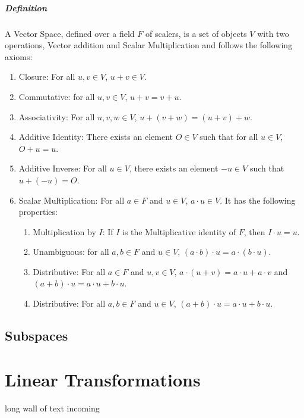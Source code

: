 \documentclass[12pt, oneside]{book}
\begin{document}
\paragraph{Definition} A Vector Space, defined over a field \( F \) of scalers, is a set of objects \(V\) with two operations, Vector addition and Scalar Multiplication and follows the following axioms:
\begin{enumerate}
    \item Closure: For all \( u,v \in V \), \(u + v \in V \).
    \item Commutative: for all \( u,v \in V \), \(u + v = v + u \).
    \item Associativity: For all \( u,v,w \in V \), \(u + (v + w) = (u + v) + w \).
    \item Additive Identity: There exists an element \( O \in V \) such that for all \( u \in V \), \(O + u = u \).
    \item Additive Inverse: For all \( u \in V \), there exists an element \( -u \in V \) such that \(u + (-u) = O \).
    \item Scalar Multiplication: For all \( a \in F \) and \( u \in V \), \(a \cdot u \in V \). It has the following properties:
    \begin{enumerate}
        \item Multiplication by \(I\): If \(I\) is the Multiplicative identity of \( F \), then \(I \cdot u = u \).
        \item Unambiguous: for all \( a,b \in F \) and \( u \in V \), \( (a \cdot b) \cdot u = a \cdot (b \cdot u) \).
        \item Distributive: For all \( a \in F \) and \( u,v \in V \), \( a \cdot (u + v) = a \cdot u + a \cdot v \) and \( (a + b) \cdot u = a \cdot u + b \cdot u \).
        \item Distributive: For all \( a,b \in F \) and \( u \in V \), \( (a + b) \cdot u = a \cdot u + b \cdot u \).
    \end{enumerate}
\end{enumerate}
\section{Subspaces}
\chapter{Linear Transformations}
long wall of text incoming
\end{document}
